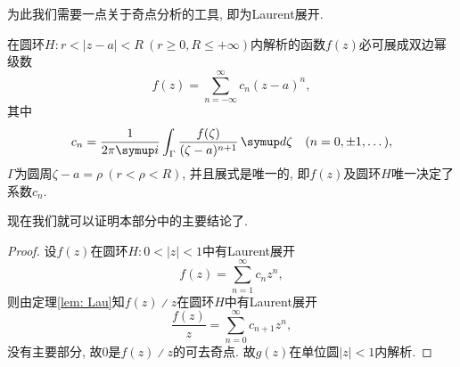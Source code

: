 为此我们需要一点关于奇点分析的工具, 即为Laurent展开.

\begin{theorem}\label{lem: Lau}
    在圆环$H\colon r<|z-a|<R\ (r\geq 0, R\leq +\infty)$内解析的函数$f(z)$必可展成双边幂级数
    \begin{equation}
        f(z) = \sum_{n=-\infty}^{\infty}c_n(z-a)^n,
    \end{equation}
    其中
    \begin{equation}
        c_n = \frac{1}{2\pi \mi}\int_{\Gamma}\frac{f(\zeta)}{(\zeta-a)^{n+1}}\diff\zeta\quad (n=0, \pm 1, \dotsc),
    \end{equation}
    $\Gamma$为圆周$\zeta-a=\rho\ (r<\rho<R)$, 并且展式是唯一的, 即$f(z)$及圆环$H$唯一决定了系数$c_n$.
\end{theorem}

现在我们就可以证明本部分中的主要结论了.

\thmca

\begin{proof}
    设$f(z)$在圆环$H\colon 0<|z|<1$中有Laurent展开
    \begin{equation}
        f(z) = \sum_{n=1}^{\infty}c_nz^n,
    \end{equation}
    则由定理\ref{lem: Lau}知$f(z)\divslash z$在圆环$H$中有Laurent展开
    \begin{equation}
        \frac{f(z)}{z} = \sum_{n=0}^{\infty}c_{n+1}z^n,
    \end{equation}
    没有主要部分, 故0是$f(z)\divslash z$的可去奇点. 故$g(z)$在单位圆$|z|<1$内解析.
\end{proof}
